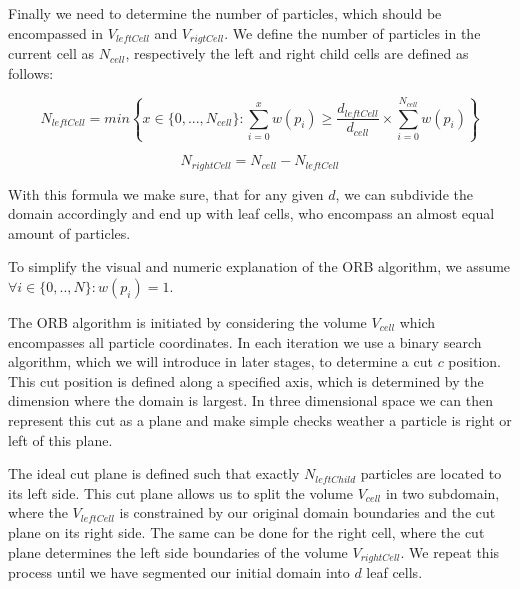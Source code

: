 \documentclass[]{article}
\begin{document}
Finally we need to determine the number of particles, which should be encompassed in $V_{leftCell}$ and $V_{rigtCell}$. We define the number of particles in the current cell as $N_{cell}$, respectively the left and right child cells are defined as follows:

\begin{center}
	\begin{equation}
		N_{leftCell} = min \left \{ x \in \{0,...,N_{cell} \} : \sum_{i=0}^{x} w(p_i) \geq \frac{d_{leftCell}}{d_{cell}} \times \sum_{i=0}^{N_{cell}} w(p_i) \right \} 
	\end{equation}
\end{center}

\begin{center}
	\begin{equation}
		N_{rightCell} = N_{cell} - N_{leftCell}
	\end{equation}
\end{center}

With this formula we make sure, that for any given $d$, we can subdivide the domain accordingly and end up with leaf cells, who encompass an almost equal amount of particles.


To simplify the visual and numeric explanation of the ORB algorithm, we assume $\forall i \in \{0,..,N\} : w(p_i) = 1$.

The ORB algorithm is initiated by considering the volume $V_{cell}$ which encompasses all particle coordinates. In each iteration we use a binary search algorithm, which we will introduce in later stages, to determine a cut $c$ position. This cut position is defined along a specified axis, which is determined by the dimension where the domain is largest. In three dimensional space we can then represent this cut as a plane and make simple checks weather a particle is right or left of this plane. 

The ideal cut plane is defined such that exactly $N_{leftChild}$ particles are located to its left side. This cut plane allows us to split the volume $V_{cell}$ in two subdomain, where the $V_{leftCell}$ is constrained by our original domain boundaries and the cut plane on its right side. The same can be done for the right cell, where the cut plane determines the left side boundaries of the volume $V_{rightCell}$. We repeat this process until we have segmented our initial domain into $d$ leaf cells.
\end{document}
